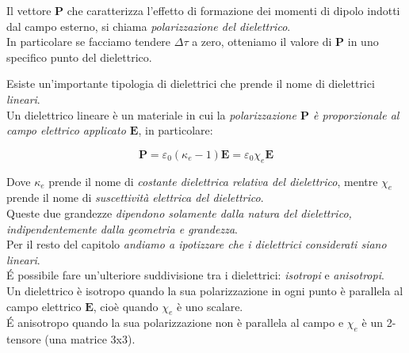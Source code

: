 Il  vettore $\mathbf{P}$ che caratterizza l'effetto di formazione dei momenti di dipolo indotti dal campo esterno, si chiama \emph{polarizzazione del dielettrico}.\\
In particolare se facciamo tendere $\Delta \tau$ a zero, otteniamo il valore di $\mathbf{P}$ in uno specifico punto del dielettrico. \\

\newpage

Esiste un'importante tipologia di dielettrici che prende  il nome di dielettrici \emph{lineari}.\\ 
Un dielettrico lineare è un materiale in cui la \emph{polarizzazione $\mathbf{P}$ è proporzionale al campo elettrico applicato $\mathbf{E}$}, in particolare:

\begin{tcolorbox}[colback=yellow!10!white, colframe=orange!70!black, boxrule=0.8pt]
\begin{equation}
    \mathbf{P} = \varepsilon_0 (\kappa_e - 1) \mathbf{E} = \varepsilon_0 \chi_e \mathbf{E}
\end{equation}
\end{tcolorbox}

Dove $\kappa_e$ prende il  nome di \emph{costante dielettrica relativa del dielettrico}, mentre $\chi_e$ prende il nome di   \emph{suscettività elettrica del dielettrico}.\\
Queste due grandezze \emph{dipendono solamente dalla natura del dielettrico, indipendentemente dalla geometria e grandezza}.\\

Per il resto del capitolo \emph{andiamo a ipotizzare che i dielettrici considerati siano lineari}.\\

\' E possibile fare un'ulteriore suddivisione tra i dielettrici: \emph{isotropi} e \emph{anisotropi}. \\

Un dielettrico è isotropo quando la sua polarizzazione in ogni punto è parallela al campo elettrico $\mathbf{E}$, cioè quando $\chi_e$ è uno scalare. \\

\' E anisotropo quando la sua polarizzazione non è parallela al campo e $\chi_e$ è un 2-tensore (una matrice 3x3). \\

